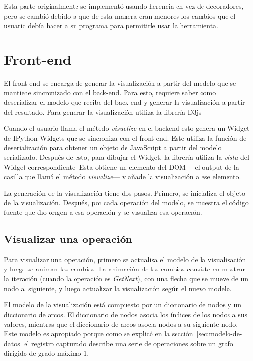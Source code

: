 Esta parte originalmente se implementó usando herencia en vez de decoradores, pero se cambió debido a que de esta manera eran menores los cambios que el usuario debía hacer a su programa para permitirle usar la herramienta.

\section{Front-end}

El front-end se encarga de generar la visualización a partir del modelo que se mantiene sincronizado con el back-end. Para esto, requiere saber como deserializar el modelo que recibe del back-end y generar la visualización a partir del resultado. Para generar la visualización utiliza la librería D3js.

Cuando el usuario llama el método \textit{visualize} en el backend esto genera un Widget de IPython Widgets que se sincroniza con el front-end. Este utiliza la función de deserialización para obtener un objeto de JavaScript a partir del modelo serializado. Después de esto, para dibujar el Widget, la librería utiliza la \textit{vista} del Widget correspondiente. Esta obtiene un elemento del DOM ---el output de la casilla que llamó el método \textit{visualize}--- y añade la visualización a ese elemento.

La generación de la visualización tiene dos pasos. Primero, se inicializa el objeto de la visualización. Después, por cada operación del modelo, se muestra el código fuente que dio origen a esa operación y se visualiza esa operación.

\subsection{Visualizar una operación}

Para visualizar una operación, primero se actualiza el modelo de la visualización y luego se animan los cambios. La animación de los cambios consiste en mostrar la iteración (cuando la operación es \textit{GetNext}), con una flecha que se mueve de un nodo al siguiente, y luego actualizar la visualización según el nuevo modelo.

El modelo de la visualización está compuesto por un diccionario de nodos y un diccionario de arcos. El diccionario de nodos asocia los índices de los nodos a sus valores, mientras que el diccionario de arcos asocia nodos a su siguiente nodo. Este modelo es apropiado porque como se explicó en la sección~\ref{sec:modelo-de-datos} el registro capturado describe una serie de operaciones sobre un grafo dirigido de grado máximo 1.

